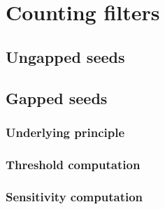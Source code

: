 \appendix

\chapter{Counting filters}
\section{Ungapped seeds}
\section{Gapped seeds}
\subsection{Underlying principle}
\subsection{Threshold computation}
\subsection{Sensitivity computation}
